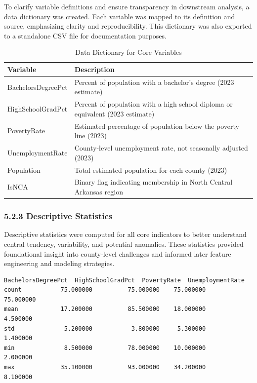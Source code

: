 \documentclass{llncs}
\begin{document}
To clarify variable definitions and ensure transparency in downstream analysis, a data dictionary was created. Each variable was mapped to its definition and source, emphasizing clarity and reproducibility. This dictionary was also exported to a standalone CSV file for documentation purposes.

\begin{table}[H]
\centering
\caption{Data Dictionary for Core Variables}
\label{tab:data_dictionary}
\begin{tabularx}{\textwidth}{lX}
\toprule
\textbf{Variable} & \textbf{Description} \\
\midrule
BachelorsDegreePct & Percent of population with a bachelor’s degree (2023 estimate) \\
HighSchoolGradPct & Percent of population with a high school diploma or equivalent (2023 estimate) \\
PovertyRate & Estimated percentage of population below the poverty line (2023) \\
UnemploymentRate & County-level unemployment rate, not seasonally adjusted (2023) \\
Population & Total estimated population for each county (2023) \\
IsNCA & Binary flag indicating membership in North Central Arkansas region \\
\bottomrule
\end{tabularx}
\end{table}
\vspace{-2em}
\FloatBarrier

\subsubsection{5.2.3 Descriptive Statistics}

Descriptive statistics were computed for all core indicators to better understand central tendency, variability, and potential anomalies. These statistics provided foundational insight into county-level challenges and informed later feature engineering and modeling strategies.

\begin{lstlisting}[caption={Summary Statistics of Core Indicators}]
       BachelorsDegreePct  HighSchoolGradPct  PovertyRate  UnemploymentRate  
count           75.000000          75.000000    75.000000         75.000000  
mean            17.200000          85.500000    18.000000          4.500000  
std              5.200000           3.800000     5.300000          1.400000  
min              8.500000          78.000000    10.000000          2.000000  
max             35.100000          93.000000    34.200000          8.100000  
\end{lstlisting}
\end{document}
